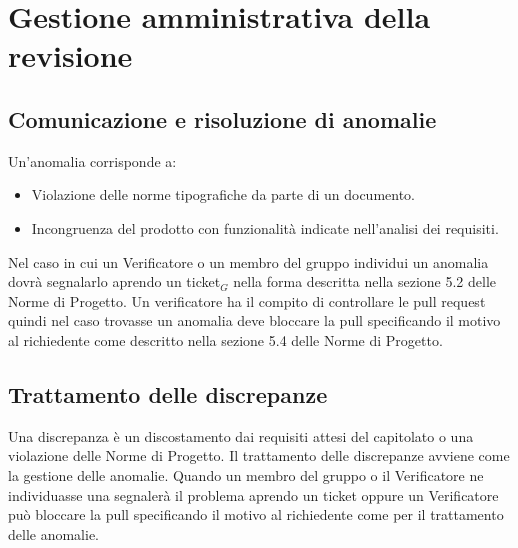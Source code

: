 \section{Gestione amministrativa della revisione}
\subsection{Comunicazione e risoluzione di anomalie}
Un'anomalia corrisponde a:
\begin{itemize}
	\item Violazione delle norme tipografiche da parte di un documento.
	\item Incongruenza del prodotto con funzionalità indicate nell'analisi dei requisiti.
\end{itemize}
Nel caso in cui un Verificatore o un membro del gruppo individui un anomalia dovrà segnalarlo aprendo un ticket$_G$ nella forma descritta nella sezione 5.2 delle Norme di Progetto. Un verificatore ha il compito di controllare le pull request quindi nel caso trovasse un anomalia deve bloccare la pull specificando il motivo al richiedente come descritto nella sezione 5.4 delle Norme di Progetto.
\subsection{Trattamento delle discrepanze}
Una discrepanza è un discostamento dai requisiti attesi del capitolato o una violazione delle Norme di Progetto.
Il trattamento delle discrepanze avviene come la gestione delle anomalie. Quando un membro del gruppo o il Verificatore ne individuasse una segnalerà il problema aprendo un ticket oppure un Verificatore può bloccare la pull specificando il motivo al richiedente come per il trattamento delle anomalie.
